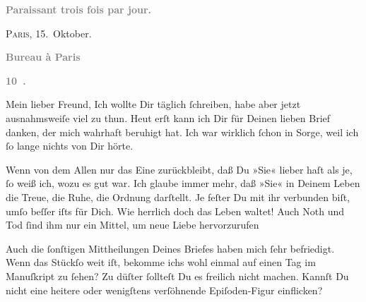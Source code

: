 \pstart
           \begin{otherlanguage}{french}\textcolor{gray}{\textbf{\textbf{Paraissant trois fois par jour.}}}\end{otherlanguage}\hfill \textsc{Paris}, 15. Oktober.\pend
           
\pstart
           \begin{otherlanguage}{french}\textcolor{gray}{\textbf{\textbf{Bureau à Paris}}}\end{otherlanguage}\pend
           
\pstart
           \begin{otherlanguage}{french}\textcolor{gray}{\textbf{\textbf{10 .}}}\end{otherlanguage}\pend
           
\pstart\center{}Mein lieber Freund,\pend\vspace{0.5em}
\pstart
           Ich wollte Dir täglich{ }ſchreiben, habe aber jetzt ausnahmsweiſe viel zu thun. Heut erſt kann ich Dir für Deinen lieben Brief danken,
               der mich wahrhaft beruhigt hat. Ich war wirklich{ }ſchon in Sorge, weil ich{ }ſo lange
               nichts \introOben{}von Dir\introOben{} hörte.\pend
           
\pstart
           Wenn von dem Allen nur das Eine zurückbleibt, daß Du »Sie« lieber haſt als je,{ }ſo weiß ich, wozu
               es gut war. Ich glaube immer mehr, daß »Sie« in Deinem Leben die Treue, die Ruhe, die Ordnung
               darſtellt. Je feſter Du mit ihr verbunden biſt, umſo beſſer iſts für Dich. Wie
               herrlich doch {\pb}das Leben waltet! Auch Noth und Tod{ }ſind ihm nur ein Mittel, um neue Liebe hervorzurufen{\dotsfive}\pend
           
\pstart
           Auch die{ }ſonſtigen Mittheilungen Deines Briefes haben mich{ }ſehr befriedigt. Wenn das
                  Stückſo weit
               iſt, bekomme ichs wohl einmal auf einen Tag im Manuſkript zu{ }ſehen? Zu düſter{ }ſollteſt Du es freilich nicht machen. Kannſt Du nicht eine heitere oder wenigſtens
               verſöhnende Epiſoden-Figur einflicken? {\dotsfive}\pend
           
